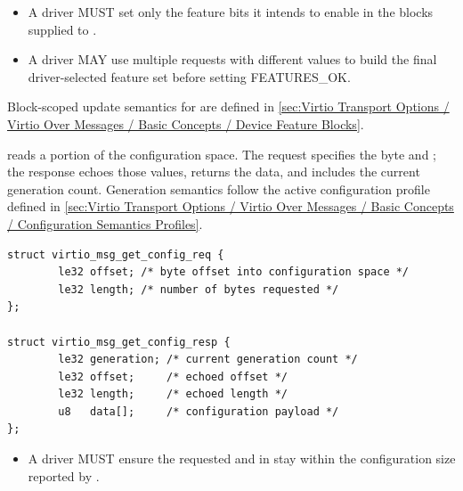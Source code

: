 \begin{itemize}
  \item A driver MUST set only the feature bits it intends to enable in the
        blocks supplied to .
  \item A driver MAY use multiple  requests with
        different  values to build the final driver-selected
        feature set before setting FEATURES\_OK.
\end{itemize}

Block-scoped update semantics for  are defined in
\ref{sec:Virtio Transport Options / Virtio Over Messages / Basic Concepts / Device Feature Blocks}.


 reads a portion of the configuration space. The request
specifies the byte  and ; the response echoes those
values, returns the data, and includes the current generation count. Generation
semantics follow the active configuration profile defined in
\ref{sec:Virtio Transport Options / Virtio Over Messages / Basic Concepts / Configuration Semantics Profiles}.

\begin{lstlisting}
struct virtio_msg_get_config_req {
        le32 offset; /* byte offset into configuration space */
        le32 length; /* number of bytes requested */
};

struct virtio_msg_get_config_resp {
        le32 generation; /* current generation count */
        le32 offset;     /* echoed offset */
        le32 length;     /* echoed length */
        u8   data[];     /* configuration payload */
};
\end{lstlisting}

\begin{itemize}
  \item A driver MUST ensure the requested  and 
        in  stay within the configuration size reported by
        .
\end{itemize}

